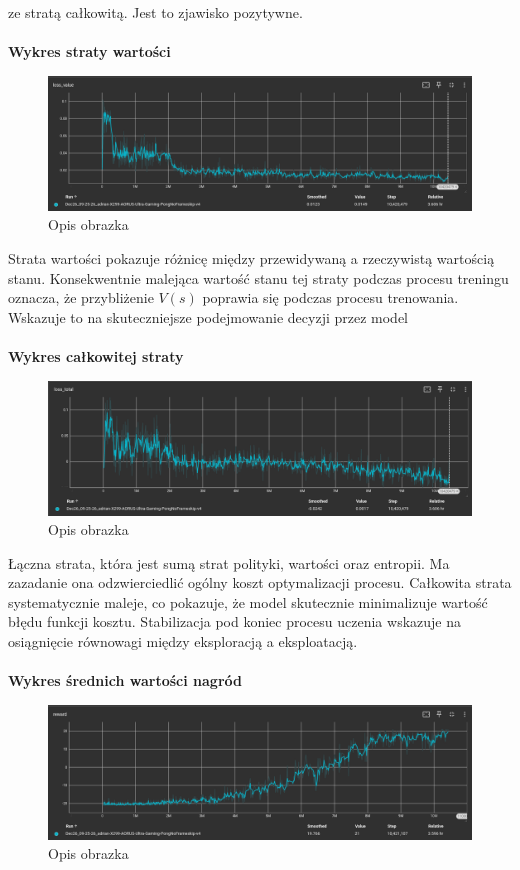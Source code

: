 \documentclass[a4paper, 12pt]{article}
\begin{document}
    ze stratą całkowitą. Jest to zjawisko pozytywne.
    \\ \\ 
    \textbf{Wykres straty wartości}
    \begin{figure}[H]
        \centering
        \includegraphics[width=\textwidth]{pictures/A2C_loss_value.png}
        \caption{Opis obrazka}
    \end{figure}
    Strata wartości pokazuje różnicę między przewidywaną a rzeczywistą wartością stanu.
    Konsekwentnie malejąca wartość stanu tej straty podczas procesu treningu oznacza, że przybliżenie \( V(s) \) poprawia się podczas procesu trenowania.
    Wskazuje to na skuteczniejsze podejmowanie decyzji przez model
    \\ \\ 
    \textbf{Wykres całkowitej straty}
    \begin{figure}[H]
        \centering
        \includegraphics[width=\textwidth]{pictures/A2C_loss_total.png}
        \caption{Opis obrazka}
    \end{figure}
    Łączna strata, która jest sumą strat polityki, wartości oraz entropii.
    Ma zazadanie ona odzwierciedlić ogólny koszt optymalizacji procesu. Całkowita strata systematycznie maleje,
    co pokazuje, że model skutecznie minimalizuje wartość błędu funkcji kosztu.
    Stabilizacja pod koniec procesu uczenia wskazuje na osiągnięcie równowagi między eksploracją a eksploatacją.
    \\ \\ 
    \textbf{Wykres średnich wartości nagród}
    \begin{figure}[H]
        \centering
        \includegraphics[width=\textwidth]{pictures/A2C_reward.png}
        \caption{Opis obrazka}
    \end{figure}
\end{document}

